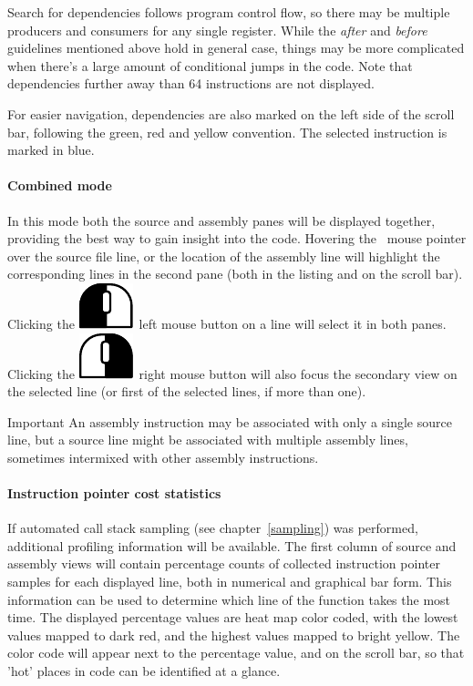 \documentclass[hidelinks,titlepage,a4paper]{article}
\newcommand{\LMB}{\includegraphics[height=.8\baselineskip]{icons/lmb}}
\newcommand{\RMB}{\includegraphics[height=.8\baselineskip]{icons/rmb}}
\begin{document}
Search for dependencies follows program control flow, so there may be multiple producers and consumers for any single register. While the \emph{after} and \emph{before} guidelines mentioned above hold in general case, things may be more complicated when there's a large amount of conditional jumps in the code. Note that dependencies further away than 64 instructions are not displayed.

For easier navigation, dependencies are also marked on the left side of the scroll bar, following the green, red and yellow convention. The selected instruction is marked in blue.

\paragraph{Combined mode}

In this mode both the source and assembly panes will be displayed together, providing the best way to gain insight into the code. Hovering the \faMousePointer{}~mouse pointer over the source file line, or the location of the assembly line will highlight the corresponding lines in the second pane (both in the listing and on the scroll bar). Clicking the \LMB{}~left mouse button on a line will select it in both panes. Clicking the \RMB{}~right mouse button will also focus the secondary view on the selected line (or first of the selected lines, if more than one).

\begin{bclogo}[
noborder=true,
couleur=black!5,
logo=\bcbombe
]{Important}
An assembly instruction may be associated with only a single source line, but a source line might be associated with multiple assembly lines, sometimes intermixed with other assembly instructions.
\end{bclogo}

\paragraph{Instruction pointer cost statistics}

If automated call stack sampling (see chapter~\ref{sampling}) was performed, additional profiling information will be available. The first column of source and assembly views will contain percentage counts of collected instruction pointer samples for each displayed line, both in numerical and graphical bar form. This information can be used to determine which line of the function takes the most time. The displayed percentage values are heat map color coded, with the lowest values mapped to dark red, and the highest values mapped to bright yellow. The color code will appear next to the percentage value, and on the scroll bar, so that 'hot' places in code can be identified at a glance.
\end{document}
